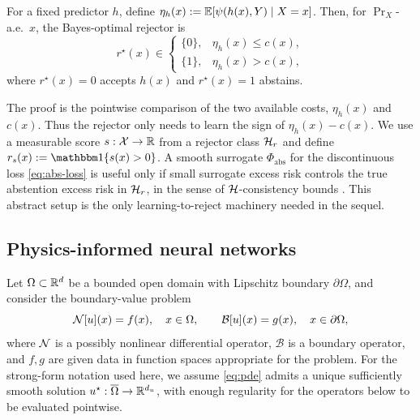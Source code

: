 \begin{lemma}
\label{lem:bayes-rej}
For a fixed predictor $h$, define
$\eta_h(x):=\mathbb{E}[\psi(h(x),Y)\mid X=x]$. Then, for $\Pr_X$-a.e.\ $x$, the
Bayes-optimal rejector is
\[
  r^\star(x) \in
  \begin{cases}
    \{0\}, & \eta_h(x) \leq c(x),\\
    \{1\}, & \eta_h(x) > c(x),
  \end{cases}
\]
where $r^\star(x)=0$ accepts $h(x)$ and $r^\star(x)=1$ abstains.
\end{lemma}

The proof is the pointwise comparison of the two available costs,
$\eta_h(x)$ and $c(x)$. Thus the rejector only needs to learn the sign of
$\eta_h(x)-c(x)$. We use a measurable score $s:\mathcal{X}\to\mathbb{R}$ from a rejector
class $\mathcal{H}_r$ and define $r_s(x):=\ind\{s(x)>0\}$. A smooth surrogate
$\Phi_{\mathrm{abs}}$ for the discontinuous loss
\eqref{eq:abs-loss} is useful only if small surrogate excess risk controls
the true abstention excess risk in $\mathcal{H}_r$, in the sense of
$\mathcal{H}$-consistency bounds
\citep{Awasthi_Mao_Mohri_Zhong_2022_multi,
mao2023crossentropylossfunctionstheoretical,Mao_Mohri_Zhong_2023}. This
abstract setup is the only learning-to-reject machinery needed in the sequel.

\subsection{Physics-informed neural networks}
\label{sec:bg-pinn}

Let $\Omega\subset\mathbb{R}^d$ be a bounded open domain with Lipschitz boundary
$\partial\Omega$, and consider the boundary-value problem
\begin{equation}
  \mathcal{N}[u](x)=f(x), \quad x\in\Omega,
  \qquad
  \mathcal{B}[u](x)=g(x), \quad x\in\partial\Omega,
  \label{eq:pde}
\end{equation}
where $\mathcal{N}$ is a possibly nonlinear differential operator,
$\mathcal{B}$ is a boundary operator, and $f,g$ are given data in function
spaces appropriate for the problem. For the strong-form notation used here,
we assume \eqref{eq:pde} admits a unique sufficiently smooth solution
$u^\star:\overline{\Omega}\to\mathbb{R}^{d_u}$, with enough regularity for the
operators below to be evaluated pointwise.

